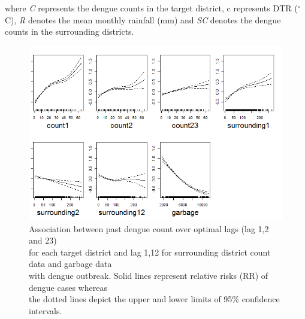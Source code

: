 \documentclass{bmcart}
\begin{document}
where \textit{C} represents the dengue counts in the target district, c represents DTR ($^{\circ}$C), \textit{R} denotes the mean monthly rainfall (mm) and \textit{SC} denotes the dengue counts in the surrounding districts. 


\begin{figure}[h!]
	\begin{center}
		\includegraphics[width= 0.97 \textwidth]{Fit-OptimalRepresentation+Garbage}
		\caption{Association between past dengue count over optimal lags (lag 1,2 and 23) \\ for each target district and lag 1,12 for surrounding district count data and garbage data \\ with dengue outbreak.  Solid lines represent relative risks (RR) of dengue cases whereas\\ the dotted lines depict the upper and lower limits of 95\% confidence intervals.}
		\label{figure-mostOptimalFit}
	\end{center}
\end{figure}
\end{document}
